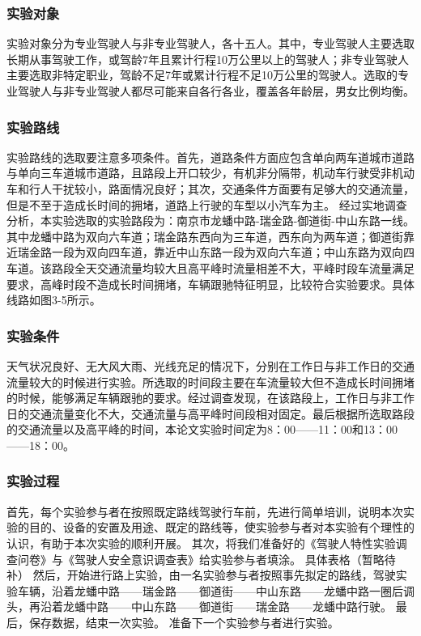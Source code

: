 \subsubsection{实验对象}
实验对象分为专业驾驶人与非专业驾驶人，各十五人。其中，专业驾驶人主要选取长期从事驾驶工作，或驾龄7年且累计行程10万公里以上的驾驶人；非专业驾驶人主要选取非特定职业，驾龄不足7年或累计行程不足10万公里的驾驶人。选取的专业驾驶人与非专业驾驶人都尽可能来自各行各业，覆盖各年龄层，男女比例均衡。
\subsubsection{实验路线}
实验路线的选取要注意多项条件。首先，道路条件方面应包含单向两车道城市道路与单向三车道城市道路，且路段上开口较少，有机非分隔带，机动车行驶受非机动车和行人干扰较小，路面情况良好；其次，交通条件方面要有足够大的交通流量，但是不至于造成长时间的拥堵，道路上行驶的车型以小汽车为主。
经过实地调查分析，本实验选取的实验路段为：南京市龙蟠中路-瑞金路-御道街-中山东路一线。其中龙蟠中路为双向六车道；瑞金路东西向为三车道，西东向为两车道；御道街靠近瑞金路一段为双向四车道，靠近中山东路一段为双向六车道；中山东路为双向四车道。该路段全天交通流量均较大且高平峰时流量相差不大，平峰时段车流量满足要求，高峰时段不造成长时间拥堵，车辆跟驰特征明显，比较符合实验要求。具体线路如图3-5所示。

\subsubsection{实验条件}
天气状况良好、无大风大雨、光线充足的情况下，分别在工作日与非工作日的交通流量较大的时候进行实验。所选取的时间段主要在车流量较大但不造成长时间拥堵的时候，能够满足车辆跟驰的要求。经过调查发现，在该路段上，工作日与非工作日的交通流量变化不大，交通流量与高平峰时间段相对固定。最后根据所选取路段的交通流量以及高平峰的时间，本论文实验时间定为8：00——11：00和13：00——18：00。
\subsubsection{实验过程}
首先，每个实验参与者在按照既定路线驾驶行车前，先进行简单培训，说明本次实验的目的、设备的安置及用途、既定的路线等，使实验参与者对本实验有个理性的认识，有助于本次实验的顺利开展。
其次，将我们准备好的《驾驶人特性实验调查问卷》与《驾驶人安全意识调查表》给实验参与者填涂。
具体表格（暂略待补）
然后，开始进行路上实验，由一名实验参与者按照事先拟定的路线，驾驶实验车辆，沿着龙蟠中路——瑞金路——御道街——中山东路——龙蟠中路一圈后调头，再沿着龙蟠中路——中山东路——御道街——瑞金路——龙蟠中路行驶。
最后，保存数据，结束一次实验。
准备下一个实验参与者进行实验。





















